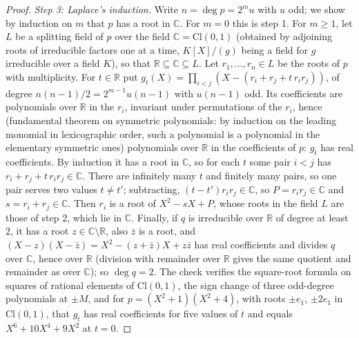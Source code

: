 \documentclass[11pt]{article}
\theoremstyle{definition}
\theoremstyle{plain}
\providecommand{\C}{}\renewcommand{\C}{\mathbb{C}}
\providecommand{\Cl}{}\renewcommand{\Cl}{\mathrm{Cl}}
\providecommand{\R}{}\renewcommand{\R}{\mathbb{R}}
\begin{document}
\begin{proof}
\emph{Step 3: Laplace's induction.} Write $n = \deg p = 2^{m}u$ with $u$ odd; we show by induction on $m$ that $p$ has a root in $\C$. For $m = 0$ this is step 1. For $m \ge 1$, let $L$ be a splitting field of $p$ over the field $\C = \Cl(0,1)$ (obtained by adjoining roots of irreducible factors one at a time, $K[X]/(g)$ being a field for $g$ irreducible over a field $K$), so that $\R \subseteq \C \subseteq L$. Let $r_{1}, \dots, r_{n} \in L$ be the roots of $p$ with multiplicity. For $t \in \R$ put $g_{t}(X) = \prod_{i<j}(X - (r_{i} + r_{j} + t\,r_{i}r_{j}))$, of degree $n(n-1)/2 = 2^{m-1}u(n - 1)$ with $u(n - 1)$ odd. Its coefficients are polynomials over $\R$ in the $r_{i}$, invariant under permutations of the $r_{i}$, hence (fundamental theorem on symmetric polynomials: by induction on the leading monomial in lexicographic order, such a polynomial is a polynomial in the elementary symmetric ones) polynomials over $\R$ in the coefficients of $p$: $g_{t}$ has real coefficients. By induction it has a root in $\C$, so for each $t$ some pair $i < j$ has $r_{i} + r_{j} + t\,r_{i}r_{j} \in \C$. There are infinitely many $t$ and finitely many pairs, so one pair serves two values $t \ne t'$; subtracting, $(t - t')r_{i}r_{j} \in \C$, so $P = r_{i}r_{j} \in \C$ and $s = r_{i} + r_{j} \in \C$. Then $r_{i}$ is a root of $X^{2} - sX + P$, whose roots in the field $L$ are those of step 2, which lie in $\C$. Finally, if $q$ is irreducible over $\R$ of degree at least $2$, it has a root $z \in \C \setminus \R$, also $\bar{z}$ is a root, and $(X - z)(X - \bar{z}) = X^{2} - (z + \bar{z})X + z\bar{z}$ has real coefficients and divides $q$ over $\C$, hence over $\R$ (division with remainder over $\R$ gives the same quotient and remainder as over $\C$); so $\deg q = 2$. The check verifies the square-root formula on squares of rational elements of $\Cl(0,1)$, the sign change of three odd-degree polynomials at $\pm M$, and for $p = (X^{2} + 1)(X^{2} + 4)$, with roots $\pm e_{1}$, $\pm 2e_{1}$ in $\Cl(0,1)$, that $g_{t}$ has real coefficients for five values of $t$ and equals $X^{6} + 10X^{4} + 9X^{2}$ at $t = 0$.


\end{proof}
\end{document}
